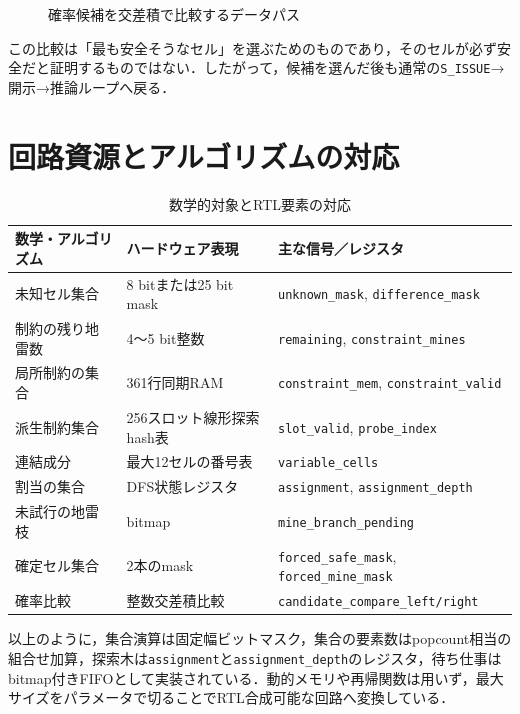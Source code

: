 \begin{figure}[tb]
  \centering
  \caption{確率候補を交差積で比較するデータパス}
  \label{fig:candidate-cross-product}
\end{figure}

この比較は「最も安全そうなセル」を選ぶためのものであり，そのセルが必ず安全だと証明するものではない．したがって，候補を選んだ後も通常の\texttt{S\_ISSUE}→開示→推論ループへ戻る．

\section{回路資源とアルゴリズムの対応}
\label{sec:component-summary}

\begin{table}[tb]
\centering
\caption{数学的対象とRTL要素の対応}
\label{tab:algorithm-rtl-map}
\begin{tabularx}{\linewidth}{lXl}
\toprule
数学・アルゴリズム & ハードウェア表現 & 主な信号／レジスタ\\
\midrule
未知セル集合 & 8 bitまたは25 bit mask & \texttt{unknown\_mask}, \texttt{difference\_mask}\\
制約の残り地雷数 & 4〜5 bit整数 & \texttt{remaining}, \texttt{constraint\_mines}\\
局所制約の集合 & 361行同期RAM & \texttt{constraint\_mem}, \texttt{constraint\_valid}\\
派生制約集合 & 256スロット線形探索hash表 & \texttt{slot\_valid}, \texttt{probe\_index}\\
連結成分 & 最大12セルの番号表 & \texttt{variable\_cells}\\
割当の集合 & DFS状態レジスタ & \texttt{assignment}, \texttt{assignment\_depth}\\
未試行の地雷枝 & bitmap & \texttt{mine\_branch\_pending}\\
確定セル集合 & 2本のmask & \texttt{forced\_safe\_mask}, \texttt{forced\_mine\_mask}\\
確率比較 & 整数交差積比較 & \texttt{candidate\_compare\_left/right}\\
\bottomrule
\end{tabularx}
\end{table}

以上のように，集合演算は固定幅ビットマスク，集合の要素数はpopcount相当の組合せ加算，探索木は\texttt{assignment}と\texttt{assignment\_depth}のレジスタ，待ち仕事はbitmap付きFIFOとして実装されている．動的メモリや再帰関数は用いず，最大サイズをパラメータで切ることでRTL合成可能な回路へ変換している．


